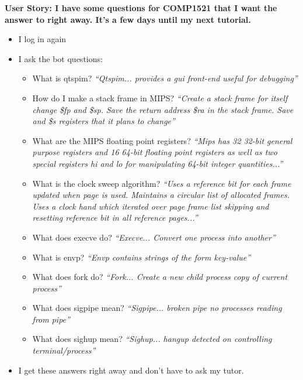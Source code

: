 \textbf{User Story: I have some questions for COMP1521 that I want the answer to right away. It’s a few days until my next tutorial.}
\begin{itemize}
    \item{I log in again}
    \item{I ask the bot questions:}
    \begin{itemize}
        \item{What is qtspim? \textit{“Qtspim... provides a gui front-end useful for debugging”}}
        \item{How do I make a stack frame in MIPS? \textit{“Create a stack frame for itself change \$fp and \$sp. Save the return address \$ra in the stack frame. Save and \$s registers that it plans to change”}}
        \item{What are the MIPS floating point registers? \textit{“Mips has 32 32-bit general purpose registers and 16 64-bit floating point registers as well as two special registers hi and lo for manipulating 64-bit integer quantities...”}}
        \item{What is the clock sweep algorithm? \textit{“Uses a reference bit for each frame updated when page is used. Maintains a circular list of allocated frames. Uses a clock hand which iterated over page frame list skipping and resetting reference bit in all reference pages...”}}
        \item{What does execve do? \textit{“Execve... Convert one process into another”}}
        \item{What is envp? \textit{“Envp contains strings of the form key-value”}}
        \item{What does fork do? \textit{“Fork... Create a new child process copy of current process”}}
        \item{What does sigpipe mean? \textit{“Sigpipe... broken pipe no processes reading from pipe”}}
        \item{What does sighup mean? \textit{“Sighup... hangup detected on controlling terminal/process”}}
    \end{itemize}
    \item{I get these answers right away and don’t have to ask my tutor.}
\end{itemize}

